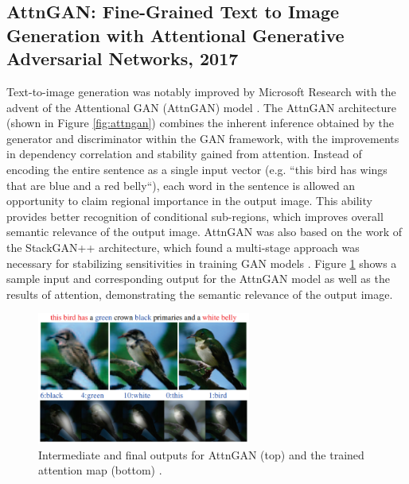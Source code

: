 \documentclass[letterpaper]{article} %
\begin{document}

\subsection{AttnGAN: Fine-Grained Text to Image Generation
with Attentional Generative Adversarial Networks, 2017}
Text-to-image generation was notably improved by Microsoft Research 
with the advent of the Attentional GAN (AttnGAN) model \cite{attngan}.
The AttnGAN architecture (shown in Figure \ref{fig:attngan}) combines the 
inherent inference obtained by the generator and discriminator within the GAN 
framework, with the improvements in dependency correlation and stability gained 
from attention. Instead of encoding the entire sentence as a single input 
vector (e.g. ``this bird has wings that are blue and a red belly``), each word 
in the sentence is allowed an opportunity to claim regional importance in the 
output image. This ability provides better recognition of conditional 
sub-regions, which improves overall semantic relevance of the output image.  
AttnGAN was also based on the work of the StackGAN++ architecture, which found 
a multi-stage approach was necessary for stabilizing sensitivities in training 
GAN models \cite{stackgan++}. Figure \ref{fig:attngan_sample} shows a sample 
input and corresponding output for the AttnGAN model as well as the results of 
attention, demonstrating the semantic relevance of the output image.

\begin{figure}[htbp]
	\centerline{\includegraphics[width=7cm]{attngan_sample.png}}
	\caption{Intermediate and final outputs for AttnGAN (top) and the trained 
	attention map (bottom)
		\cite{attngan}.}
	\label{fig:attngan_sample}
\end{figure}
\end{document}
